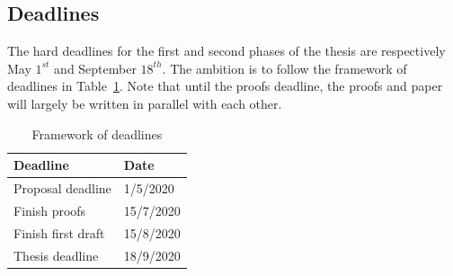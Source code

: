 \documentclass[11pt, final]{article}
\begin{document}

\subsection{Deadlines}

The hard deadlines for the first and second phases of the thesis are respectively May $1^{st}$ and September $18^{th}$. The ambition is to follow the framework of deadlines in Table~\ref{tbl:deadlines}. Note that until the proofs deadline, the proofs and paper will largely be written in parallel with each other.

\begin{table}
  \begin{center}
    \begin{tabular}{ | m{5cm} | m{5cm} | }
      \hline
      Deadline          & Date  \\
      \hline
      Proposal deadline & 1/5/2020 \\
      Finish proofs & 15/7/2020 \\
      Finish first draft & 15/8/2020 \\
      Thesis deadline & 18/9/2020 \\
      \hline
    \end{tabular}
  \end{center}
  \caption{Framework of deadlines}
  \label{tbl:deadlines}
\end{table}

\printbibliography
\makeatother
\end{document}
